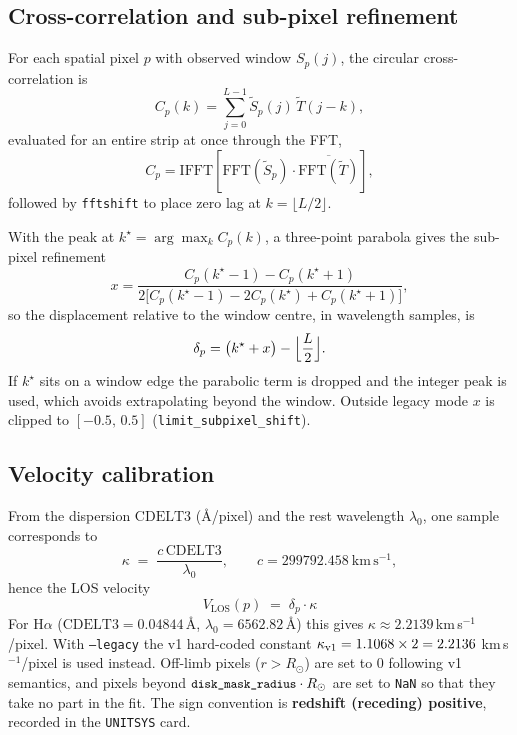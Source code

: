 \documentclass[11pt,a4paper]{article}
\newcommand{\code}[1]{\texttt{\small #1}}
\newcommand{\vlos}{V_{\mathrm{LOS}}}
\newcommand{\Rsun}{R_{\odot}}
\begin{document}
\subsection{Cross-correlation and sub-pixel refinement}
For each spatial pixel $p$ with observed window $S_p(j)$, the circular
cross-correlation is
\begin{equation}
  C_p(k) = \sum_{j=0}^{L-1} \tilde S_p(j)\, \tilde T(j-k),
  \label{eq:cc}
\end{equation}
evaluated for an entire strip at once through the FFT,
\begin{equation}
  C_p = \mathrm{IFFT}\!\left[\mathrm{FFT}(\tilde S_p)\cdot
        \overline{\mathrm{FFT}(\tilde T)}\right],
\end{equation}
followed by \code{fftshift} to place zero lag at $k = \lfloor L/2 \rfloor$.

With the peak at $k^\star = \arg\max_k C_p(k)$, a three-point parabola gives the
sub-pixel refinement
\begin{equation}
  x = \frac{C_p(k^\star-1) - C_p(k^\star+1)}
           {2\bigl[C_p(k^\star-1) - 2C_p(k^\star) + C_p(k^\star+1)\bigr]},
  \label{eq:parab}
\end{equation}
so the displacement relative to the window centre, in wavelength samples, is
\begin{equation}
  \delta_p = \bigl(k^\star + x\bigr) - \Bigl\lfloor \frac{L}{2} \Bigr\rfloor .
  \label{eq:disp}
\end{equation}
If $k^\star$ sits on a window edge the parabolic term is dropped and the integer
peak is used, which avoids extrapolating beyond the window.  Outside legacy mode
$x$ is clipped to $[-0.5,\,0.5]$ (\code{limit\_subpixel\_shift}).

\subsection{Velocity calibration}
From the dispersion $\mathrm{CDELT3}$ (\AA/pixel) and the rest wavelength
$\lambda_0$, one sample corresponds to
\begin{equation}
  \kappa \;=\; \frac{c\,\mathrm{CDELT3}}{\lambda_0},
  \qquad c = 299792.458\ \mathrm{km\,s^{-1}},
  \label{eq:scale}
\end{equation}
hence the LOS velocity
\begin{equation}
  \boxed{\;\vlos(p) \;=\; \delta_p \cdot \kappa\;}
  \label{eq:vlos}
\end{equation}
For H$\alpha$ ($\mathrm{CDELT3}=0.04844$\,\AA, $\lambda_0=6562.82$\,\AA) this
gives $\kappa \approx 2.2139$\,km\,s$^{-1}$/pixel.  With \code{--legacy} the
v1 hard-coded constant $\kappa_{\rm v1} = 1.1068\times2 = 2.2136$
km\,s$^{-1}$/pixel is used instead.  Off-limb pixels ($r>\Rsun$) are set to 0
following v1 semantics, and pixels beyond
$\code{disk\_mask\_radius}\cdot\Rsun$ are set to \code{NaN} so that they take no
part in the fit.  The sign convention is \textbf{redshift (receding) positive},
recorded in the \code{UNITSYS} card.
\end{document}
